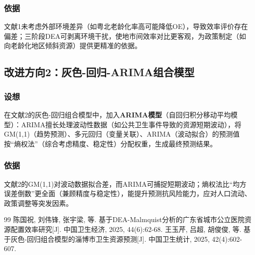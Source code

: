 \documentclass{MathNoteCN}
\begin{document}
\subsubsection{依据}
文献1未考虑外部环境差异（如粤北老龄化率高可能降低OE），导致效率评价存在偏差；三阶段DEA可剥离环境干扰，使地市间效率对比更客观，为政策制定（如向老龄化地区倾斜资源）提供更精准的依据\cite{chen2025}。


\subsection{改进方向2：灰色-回归-ARIMA组合模型}
\subsubsection{设想}
在文献2的灰色-回归组合模型中，加入\textbf{ARIMA模型}（自回归积分移动平均模型）：ARIMA擅长处理波动性数据（如公共卫生事件导致的资源短期波动），将GM(1,1)（趋势预测）、多元回归（变量关联）、ARIMA（波动拟合）的预测值按“熵权法”（综合考虑精度、稳定性）分配权重，生成最终预测结果。

\subsubsection{依据}
文献2的GM(1,1)对波动数据拟合差，而ARIMA可捕捉短期波动；熵权法比“均方误差倒数”更全面（兼顾精度与稳定性），能提升预测抗风险能力，应对人口流动、政策调整等突发因素\cite{wang2025}。

\begin{thebibliography}{99}
 陈国祝, 刘伟锋, 张宇梁, 等. 基于DEA-Malmquist分析的广东省城市公立医院资源配置效率研究[J]. 中国卫生经济, 2025, 44(6):62-68.
 王玉芹, 吕超, 胡俊俊, 等. 基于灰色-回归组合模型的淄博市卫生资源预测[J]. 中国卫生统计, 2025, 42(4):602-607.
\end{thebibliography}

		
\end{document}
